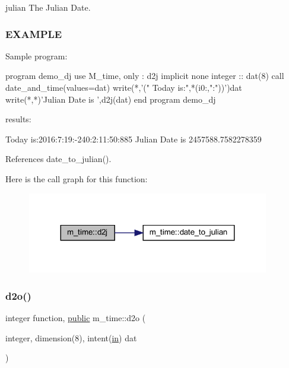 julian The Julian Date.

\subsubsection*{E\+X\+A\+M\+P\+LE}

\begin{DoxyVerb}Sample program:

 program demo_dj
 use M_time, only : d2j
 implicit none
 integer :: dat(8)
    call date_and_time(values=dat)
    write(*,'(" Today is:",*(i0:,":"))')dat
    write(*,*)'Julian Date is ',d2j(dat)
 end program demo_dj

results:

 Today is:2016:7:19:-240:2:11:50:885
 Julian Date is    2457588.7582278359 \end{DoxyVerb}
 

References date\+\_\+to\+\_\+julian().

Here is the call graph for this function\+:
\nopagebreak
\begin{figure}[H]
\begin{center}
\leavevmode
\includegraphics[width=299pt]{namespacem__time_a3fccc53c2650104eff084c7998d18f54_cgraph}
\end{center}
\end{figure}
\mbox{\label{namespacem__time_a727dd77bbd4a5d0e3947c5d303845947}} 
\subsubsection{\texorpdfstring{d2o()}{d2o()}}
{\footnotesize\ttfamily integer function, \hyperlink{M__stopwatch_83_8txt_a2f74811300c361e53b430611a7d1769f}{public} m\+\_\+time\+::d2o (\begin{DoxyParamCaption}\item[{integer, dimension(8), intent(\hyperlink{M__journal_83_8txt_afce72651d1eed785a2132bee863b2f38}{in})}]{dat }\end{DoxyParamCaption})}



